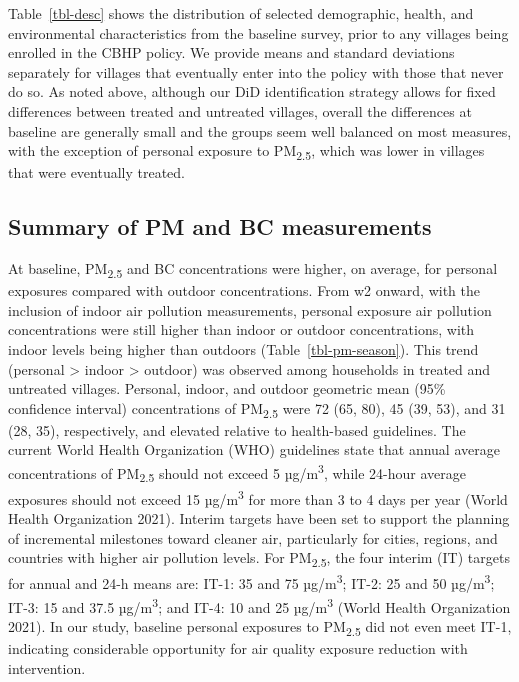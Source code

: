\documentclass[
  letterpaper,
  DIV=11,
  numbers=noendperiod]{scrartcl}
\begin{document}
Table~\ref{tbl-desc} shows the distribution of selected demographic,
health, and environmental characteristics from the baseline survey,
prior to any villages being enrolled in the CBHP policy. We provide
means and standard deviations separately for villages that eventually
enter into the policy with those that never do so. As noted above,
although our DiD identification strategy allows for fixed differences
between treated and untreated villages, overall the differences at
baseline are generally small and the groups seem well balanced on most
measures, with the exception of personal exposure to
PM\textsubscript{2.5}, which was lower in villages that were eventually
treated.

\subsection{Summary of PM and BC
measurements}\label{summary-of-pm-and-bc-measurements}

At baseline, PM\textsubscript{2.5} and BC concentrations were higher, on
average, for personal exposures compared with outdoor concentrations.
From w2 onward, with the inclusion of indoor air pollution measurements,
personal exposure air pollution concentrations were still higher than
indoor or outdoor concentrations, with indoor levels being higher than
outdoors (Table~\ref{tbl-pm-season}). This trend (personal
\textgreater{} indoor \textgreater{} outdoor) was observed among
households in treated and untreated villages. Personal, indoor, and
outdoor geometric mean (95\% confidence interval) concentrations of
PM\textsubscript{2.5} were 72 (65, 80), 45 (39, 53), and 31 (28, 35),
respectively, and elevated relative to health-based guidelines. The
current World Health Organization (WHO) guidelines state that annual
average concentrations of PM\textsubscript{2.5} should not exceed 5
µg/m\textsuperscript{3}, while 24-hour average exposures should not
exceed 15 µg/m\textsuperscript{3} for more than 3 to 4 days per year
(World Health Organization 2021). Interim targets have been set to
support the planning of incremental milestones toward cleaner air,
particularly for cities, regions, and countries with higher air
pollution levels. For PM\textsubscript{2.5}, the four interim (IT)
targets for annual and 24-h means are: IT-1: 35 and 75
µg/m\textsuperscript{3}; IT-2: 25 and 50 µg/m\textsuperscript{3}; IT-3:
15 and 37.5 µg/m\textsuperscript{3}; and IT-4: 10 and 25
µg/m\textsuperscript{3} (World Health Organization 2021). In our study,
baseline personal exposures to PM\textsubscript{2.5} did not even meet
IT-1, indicating considerable opportunity for air quality exposure
reduction with intervention.
\end{document}
